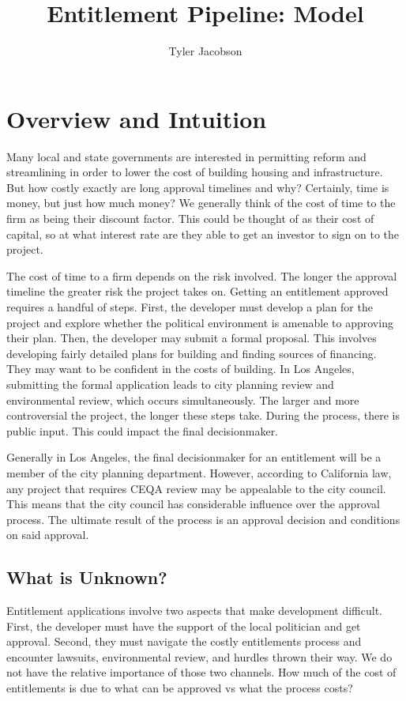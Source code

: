 \documentclass[12pt]{article}
\title{Entitlement Pipeline: Model}
\author{Tyler Jacobson}
\theoremstyle{definition}
\begin{document}
\maketitle

\section{Overview and Intuition}
Many local and state governments are interested in permitting reform and streamlining in order to lower the cost of building housing and infrastructure. But how costly exactly are long approval timelines and why? Certainly, time is money, but just how much money? We generally think of the cost of time to the firm as being their discount factor. This could be thought of as their cost of capital, so at what interest rate are they able to get an investor to sign on to the project. 

The cost of time to a firm depends on the risk involved. The longer the approval timeline the greater risk the project takes on. Getting an entitlement approved requires a handful of steps. First, the developer must develop a plan for the project and explore whether the political environment is amenable to approving their plan. Then, the developer may submit a formal proposal. This involves developing fairly detailed plans for building and finding sources of financing. They may want to be confident in the costs of building. In Los Angeles, submitting the formal application leads to city planning review and environmental review, which occurs simultaneously. The larger and more controversial the project, the longer these steps take. During the process, there is public input. This could impact the final decisionmaker. 

Generally in Los Angeles, the final decisionmaker for an entitlement will be a member of the city planning department. However, according to California law, any project that requires CEQA review may be appealable to the city council. This means that the city council has considerable influence over the approval process. The ultimate result of the process is an approval decision and conditions on said approval. 

\subsection{What is Unknown?}
Entitlement applications involve two aspects that make development difficult. First, the developer must have the support of the local politician and get approval. Second, they must navigate the costly entitlements process and encounter lawsuits, environmental review, and hurdles thrown their way. We do not have the relative importance of those two channels. How much of the cost of entitlements is due to what can be approved vs what the process costs?
\end{document}
